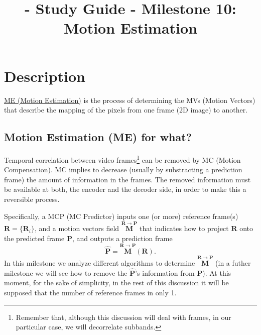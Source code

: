 
\title{\SM{} - Study Guide - Milestone 10: Motion Estimation}

\maketitle

\tableofcontents

\section{Description}

\href{https://en.wikipedia.org/wiki/Motion_estimation}{ME (Motion
  Estimation)} is the process of determining the MVs (Motion Vectors)
that describe the mapping of the pixels from one frame (2D image) to
another.

\subsection{Motion Estimation (ME) for what?}
Temporal correlation between video frames\footnote{Remember that,
although this discussion will deal with frames, in our particular
case, we will decorrelate subbands.} can be removed by MC (Motion
Compensation). MC implies to decrease (usually by substracting a
prediction frame) the amount of information in the frames. The removed
information must be available at both, the encoder and the decoder
side, in order to make this a reversible process.

Specifically, a MCP (MC Predictor) inputs one (or more) reference
frame(s) ${\mathbf R}=\{{\mathbf R}_i\}$, and a motion vectors field
$\overset{{\mathbf R}\rightarrow{\mathbf P}}{\mathbf M}$ that
indicates how to project ${\mathbf R}$ onto the predicted frame ${\mathbf P}$, and outputs
a prediction frame
\begin{equation}
  \hat{{\mathbf P}} =  \overset{{\mathbf R}\rightarrow {\mathbf P}}{\mathbf M}({\mathbf R}).
  \label{eq:MCP1}
\end{equation}
In this milestone we analyze different algorithms to determine
$\overset{{\mathbf R}\rightarrow {\mathbf P}}{\mathbf M}$ (in a futher
milestone we will see how to remove the $\hat{{\mathbf P}}$'s
information from ${\mathbf P}$). At this moment, for the sake of
simplicity, in the rest of this discussion it will be supposed that the
number of reference frames in only 1.

